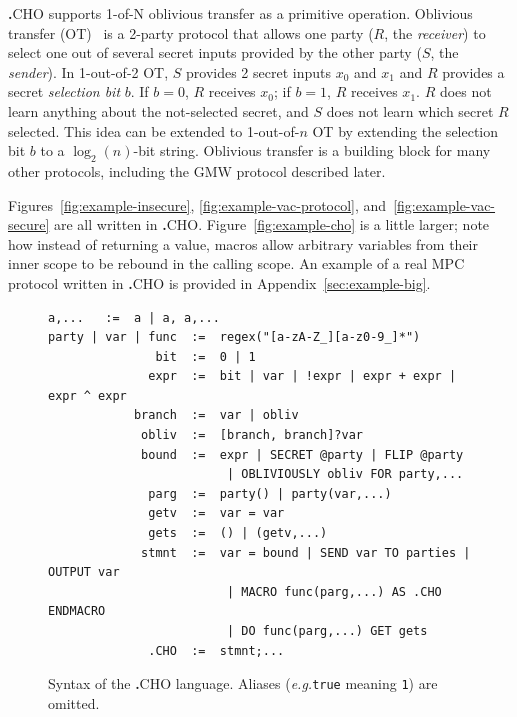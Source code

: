 \documentclass[acmlarge, manuscript, screen, review, anonymous, table]{acmart}
\newcommand{\eg}{\textit{e.g.}\xspace}
\newcommand{\langname}{\textsc{\textbf{.}CHO}\xspace}
\begin{document}
\langname supports 1-of-N oblivious transfer as a primitive operation.
Oblivious transfer (OT)~\cite{kilian1988founding} is a 2-party protocol that allows one party ($R$, the \emph{receiver}) to select one out of several secret inputs provided by the other party ($S$, the \emph{sender}). In 1-out-of-2 OT, $S$ provides 2 secret inputs $x_0$ and $x_1$ and $R$ provides a secret \emph{selection bit} $b$. If $b=0$, $R$ receives $x_0$; if $b=1$, $R$ receives $x_1$. $R$ does not learn anything about the not-selected secret, and $S$ does not learn which secret $R$ selected. This idea can be extended to 1-out-of-$n$ OT by extending the selection bit $b$ to a $\log_2(n)$-bit string.
%
Oblivious transfer is a building block for many other protocols, including the GMW protocol described later.

Figures~\ref{fig:example-insecure}, \ref{fig:example-vac-protocol}, and~\ref{fig:example-vac-secure} are all written in \langname.
Figure~\ref{fig:example-cho} is a little larger; note how instead of returning a value,
macros allow arbitrary variables from their inner scope to be rebound in the calling scope.
An example of a real MPC protocol written in \langname is provided in Appendix~\ref{sec:example-big}.

\begin{figure}[tbhp]
  \begin{mdframed}
      \begin{lstlisting}[basicstyle=\ttfamily]
            a,...   :=  a | a, a,...
party | var | func  :=  regex("[a-zA-Z_][a-z0-9_]*")
               bit  :=  0 | 1
              expr  :=  bit | var | !expr | expr + expr | expr ^ expr
            branch  :=  var | obliv
             obliv  :=  [branch, branch]?var
             bound  :=  expr | SECRET @party | FLIP @party
                         | OBLIVIOUSLY obliv FOR party,...
              parg  :=  party() | party(var,...)
              getv  :=  var = var
              gets  :=  () | (getv,...)
             stmnt  :=  var = bound | SEND var TO parties | OUTPUT var
                         | MACRO func(parg,...) AS .CHO ENDMACRO
                         | DO func(parg,...) GET gets
              .CHO  :=  stmnt;...
      \end{lstlisting}
  \end{mdframed}
  \caption{Syntax of the \langname language.
      Aliases (\eg \texttt{true} meaning \texttt{1})
      are omitted.}
  \label{fig:cho-bnf}
\end{figure}
\end{document}

